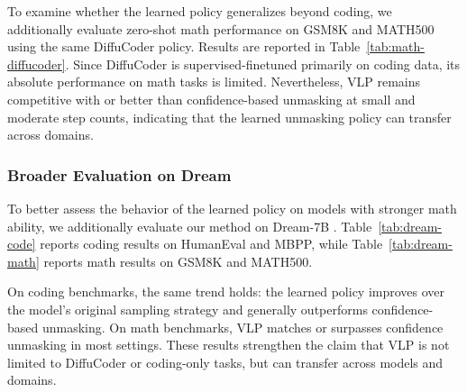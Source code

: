 To examine whether the learned policy generalizes beyond coding, we additionally evaluate zero-shot math performance on GSM8K and MATH500 using the same DiffuCoder policy. Results are reported in Table~\ref{tab:math-diffucoder}. Since DiffuCoder is supervised-finetuned primarily on coding data, its absolute performance on math tasks is limited. Nevertheless, VLP remains competitive with or better than confidence-based unmasking at small and moderate step counts, indicating that the learned unmasking policy can transfer across domains.




\subsubsection{Broader Evaluation on Dream}
To better assess the behavior of the learned policy on models with stronger math ability, we additionally evaluate our method on Dream-7B \citep{ye2025dream7bdiffusionlarge}. Table~\ref{tab:dream-code} reports coding results on HumanEval and MBPP, while Table~\ref{tab:dream-math} reports math results on GSM8K and MATH500.

On coding benchmarks, the same trend holds: the learned policy improves over the model's original sampling strategy and generally outperforms confidence-based unmasking. On math benchmarks, VLP matches or surpasses confidence unmasking in most settings. These results strengthen the claim that VLP is not limited to DiffuCoder or coding-only tasks, but can transfer across models and domains.



